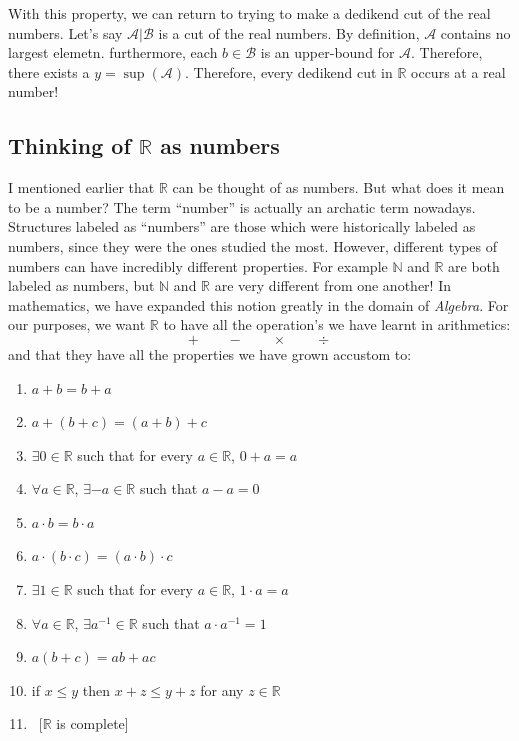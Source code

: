 \documentclass{book}
\newcommand{\N}{{\mathbb{N}}}
\newcommand{\R}{{\mathbb{R}}}
\begin{document}
With this property, we can return to trying to make a dedikend cut of the real numbers. Let's say $\mathcal{A}
| \mathcal{B}$ is a cut of the real numbers. By definition, $\mathcal{A}$ contains no largest elemetn. furthermore, each
$b \in \mathcal{B}$ is an upper-bound for $\mathcal{A}$. Therefore, there exists a $y = \sup(\mathcal{A})$. Therefore,
every dedikend cut in $\R$ occurs at a real number!

\subsection[thinking or reals as numbers]{Thinking of $\R$ as numbers}

I mentioned earlier that $\R$ can be thought of as numbers. But what does it mean to be a number? The term ``number'' is
actually an archatic term nowadays. Structures labeled as ``numbers'' are those which were historically labeled as
numbers, since they were the ones studied the most. However, different types of numbers can have incredibly different
properties. For example $\N$ and $\R$ are both labeled as numbers, but $\N$ and $\R$ are very different from one another!
In mathematics, we have expanded this notion greatly in the domain of \emph{Algebra}. For our purposes, we want $\R$ to
have all the operation's we have learnt in arithmetics:
\[
	+\qquad -\qquad\times\qquad\div
\]
and that they have all the properties we have grown accustom to:
\begin{enumerate}
	\item $a+b = b+a$
	\item $a+(b+c) = (a+b)+c$
	\item $\exists 0 \in \R$ such that for every $a \in \R$, $0 + a = a$
	\item $\forall a \in \R$, $\exists -a \in \R$ such that $a - a = 0$
	\item $a\cdot b = b\cdot a$
	\item $a\cdot (b\cdot c) = (a\cdot b)\cdot c$
	\item $\exists 1 \in \R$ such that for every $a \in \R$, $1 \cdot a = a$
	\item $\forall a \in \R$, $\exists a^{-1} \in \R$ such that $a \cdot a^{-1} = 1$
	\item $a(b+c) = ab + ac$
	\item if $x \le y$ then $x + z \le y + z$ for any $z \in \R$
	\item \ [$\R$ is complete]
\end{enumerate}
\end{document}
